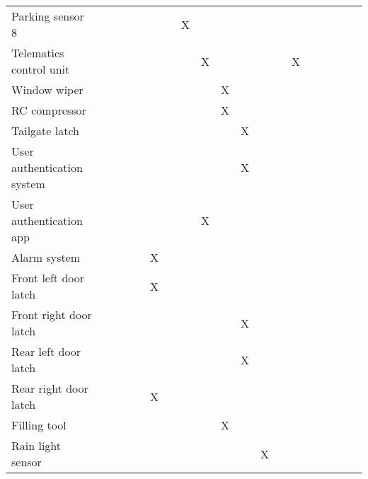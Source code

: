 \begin{table}[htb]
{\begin{tabular}{lllllllllllllllllll}
    \textcolor{mint}{Parking sensor 8}           &   &   &   &   &   &   & X &   &   &   &   & \multicolumn{1}{c|}{}  &   &   &   &   &   &   \\
    \rowcolor[gray]{0.925}
    Telematics control unit                      &   &   &   &   &   &   &   & X &   &   &   & \multicolumn{1}{c|}{}  & X &   &   &   &   &   \\
    Window wiper                                 &   &   &   &   &   &   &   &   & X &   &   & \multicolumn{1}{c|}{}  &   &   &   &   &   &   \\
    \rowcolor[gray]{0.925}
    \textcolor{mint}{RC compressor}              &   &   &   &   &   &   &   &   & X &   &   & \multicolumn{1}{c|}{}  &   &   &   &   &   &   \\
    \textcolor{mint}{Tailgate latch}             &   &   &   &   &   &   &   &   &   & X &   & \multicolumn{1}{c|}{}  &   &   &   &   &   &   \\
    \rowcolor[gray]{0.925}
    \textcolor{mint}{User authentication system} &   &   &   &   &   &   &   &   &   & X &   & \multicolumn{1}{c|}{}  &   &   &   &   &   &   \\
    \textcolor{mint}{User authentication app}    &   &   &   &   &   &   &   & X &   &   &   & \multicolumn{1}{c|}{}  &   &   &   &   &   &   \\
    \rowcolor[gray]{0.925}
    \textcolor{mint}{Alarm system}               &   &   &   &   & X &   &   &   &   &   &   & \multicolumn{1}{c|}{}  &   &   &   &   &   &   \\
    \textcolor{mint}{Front left door latch}      &   &   &   &   & X &   &   &   &   &   &   & \multicolumn{1}{c|}{}  &   &   &   &   &   &   \\
    \rowcolor[gray]{0.925}
    \textcolor{mint}{Front right door latch}     &   &   &   &   &   &   &   &   &   & X &   & \multicolumn{1}{c|}{}  &   &   &   &   &   &   \\
    \textcolor{mint}{Rear left door latch}       &   &   &   &   &   &   &   &   &   & X &   & \multicolumn{1}{c|}{}  &   &   &   &   &   &   \\
    \rowcolor[gray]{0.925}
    \textcolor{mint}{Rear right door latch}      &   &   &   &   & X &   &   &   &   &   &   & \multicolumn{1}{c|}{}  &   &   &   &   &   &   \\
    \textcolor{mint}{Filling tool}               &   &   &   &   &   &   &   &   & X &   &   & \multicolumn{1}{c|}{}  &   &   &   &   &   &   \\
    \rowcolor[gray]{0.925}
    Rain light sensor                            &   &   &   &   &   &   &   &   &   &   & X & \multicolumn{1}{c|}{}  &   &   &   &   &   &   \\

\end{tabular}}
\end{table}
